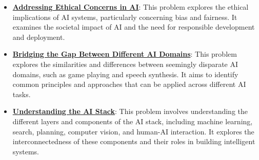 \documentclass{article}%
\begin{document}
\begin{itemize}[leftmargin=*]
\item \href{https://purdue.brightspace.com/d2l/common/assets/pdfjs-d2l-dist/1.0.14-legacy/web/viewer.html?file=\%2Fcontent\%2Fenforced\%2F1095467-wl.202510.CS.24300.001\%2F02L2-Intro.pdf\%3Fou\%3D1095467\&lang=en-us\&container=d2l-fileviewer-rendered-pdf\&fullscreen=d2l-fileviewer-rendered-pdf-dialog\&height=667#page=20}{\textbf{Addressing Ethical Concerns in AI}}: This problem explores the ethical implications of AI systems, particularly concerning bias and fairness. It examines the societal impact of AI and the need for responsible development and deployment.%
\item \href{https://purdue.brightspace.com/d2l/common/assets/pdfjs-d2l-dist/1.0.14-legacy/web/viewer.html?file=\%2Fcontent\%2Fenforced\%2F1095467-wl.202510.CS.24300.001\%2F02L2-Intro.pdf\%3Fou\%3D1095467\&lang=en-us\&container=d2l-fileviewer-rendered-pdf\&fullscreen=d2l-fileviewer-rendered-pdf-dialog\&height=667#page=31}{\textbf{Bridging the Gap Between Different AI Domains}}: This problem explores the similarities and differences between seemingly disparate AI domains, such as game playing and speech synthesis. It aims to identify common principles and approaches that can be applied across different AI tasks.%
\item \href{https://purdue.brightspace.com/d2l/common/assets/pdfjs-d2l-dist/1.0.14-legacy/web/viewer.html?file=\%2Fcontent\%2Fenforced\%2F1095467-wl.202510.CS.24300.001\%2F02L2-Intro.pdf\%3Fou\%3D1095467\&lang=en-us\&container=d2l-fileviewer-rendered-pdf\&fullscreen=d2l-fileviewer-rendered-pdf-dialog\&height=667#page=44}{\textbf{Understanding the AI Stack}}: This problem involves understanding the different layers and components of the AI stack, including machine learning, search, planning, computer vision, and human{-}AI interaction. It explores the interconnectedness of these components and their roles in building intelligent systems.%
\end{itemize}

%
\end{document}
